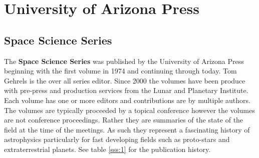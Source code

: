 
\section{University of Arizona Press}  
\subsection{Space Science Series}
The {\bf Space Science Series} was published by the University of
Arizona Press beginning with the first volume in 1974 and continuing
through today.  Tom Gehrels is the over all series editor. Since 2000
the volumes have been produce with pre-press and production services
from the Lunar and Planetary Institute. Each volume
has one or more editors and contributions are by multiple authors. The
volumes are typically proceeded by a topical conference however the
volumes are not conference proceedings. Rather they are summaries of
the state of the field at the time of the meetings.  As such they
represent a fascinating history of astrophysics particularly for fast
developing fields such as proto-stars and extraterrestrial
planets. See table \ref{sss:1} for the publication history.


